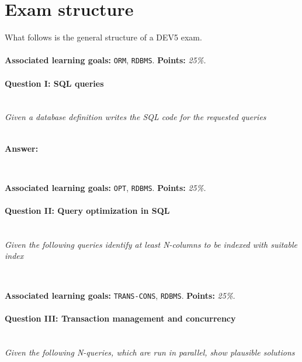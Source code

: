 \section*{Exam structure}
What follows is the general structure of a DEV5 exam.
\\ 
\\
\textbf{Associated learning goals:} \texttt{ORM}, \texttt{RDBMS}.
\textbf{Points:} \textit{25\%.}
\paragraph{Question I: SQL queries} \ \\

\textit{Given a database definition writes the SQL code for the requested queries} 

\ \\


\textbf{Answer:} \textit{}

\begin{lstlisting}
\end{lstlisting}


\ \\ 
\textbf{Associated learning goals:} \texttt{OPT}, \texttt{RDBMS}.
\textbf{Points:} \textit{25\%.}
\paragraph{Question II: Query optimization in SQL} \ \\ 

\textit{Given the following queries identify at least N-columns to be indexed with suitable index}

\begin{lstlisting}
\end{lstlisting}

\ \\ 

\textbf{Associated learning goals:} \texttt{TRANS-CONS}, \texttt{RDBMS}.
\textbf{Points:} \textit{25\%.}
\paragraph{Question III: Transaction management and concurrency}

\ \\ 

\textit{Given the following N-queries, which are run in parallel, show plausible solutions }
\begin{lstlisting}
\end{lstlisting}

